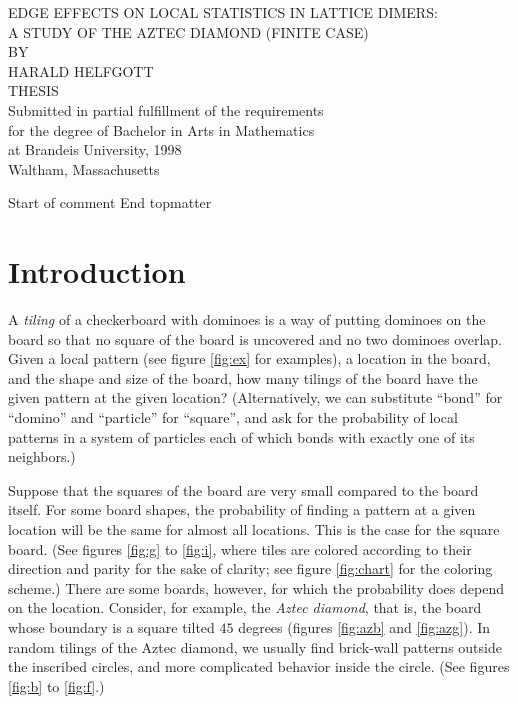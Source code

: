 \documentclass[10pt,reqno]{amsart}
\theoremstyle{plain}
\theoremstyle{definition}
\theoremstyle{remark}
\begin{document}
 
\begin{titlepage}

\begin{center}
\vspace*{1.325in}
EDGE EFFECTS ON LOCAL STATISTICS IN LATTICE DIMERS:\\
A STUDY OF THE AZTEC DIAMOND (FINITE CASE)\\
\vspace{1.365626in}
BY\\

\vspace{.2in}
HARALD HELFGOTT\\
\vspace{1.11875in}
THESIS\\
\vspace{.2in} 
Submitted in partial fulfillment of the requirements\\
for the degree of Bachelor in Arts in Mathematics\\
at Brandeis University, 1998\\
\vspace{1.19750in}
Waltham, Massachusetts
\end{center}
\end{titlepage}
\address{Mathematics Department \\
  Brandeis University
  Waltham, MA 02254-9110}
Start of comment End topmatter
\section{Introduction}

A {\em tiling} of a checkerboard with dominoes is a way of putting dominoes
on the board so that no square of the board is uncovered and no two dominoes
overlap.  Given a local pattern (see figure \ref{fig:ex} for examples), a 
location in the board, and the shape and size of the board, how many tilings
of the board have the given pattern at the given location? (Alternatively,
we can substitute ``bond'' for ``domino'' and ``particle'' for 
``square'', and ask for the probability of local patterns in a system
of particles each of which bonds with exactly one of its neighbors.)

Suppose that the squares of the board are very small compared to the
board itself. For some board shapes, the probability of finding a pattern
at a given location will be the same for almost all locations. This is
the case for the square board. (See figures \ref{fig:g} to \ref{fig:i},
where tiles are colored according to their direction and parity for
the sake of clarity; see figure \ref{fig:chart} for the coloring scheme.)
There are some boards, however, for which the probability does depend
on the location. Consider, for example, the {\em Aztec diamond}, that is,
the board whose boundary is a square tilted $45$ degrees 
(figures \ref{fig:azb} and \ref{fig:azg}). 
In random tilings of the Aztec diamond, we usually find brick-wall patterns 
outside the inscribed circles, and more complicated behavior inside
the circle. (See figures \ref{fig:b} to \ref{fig:f}.)
\end{document}
